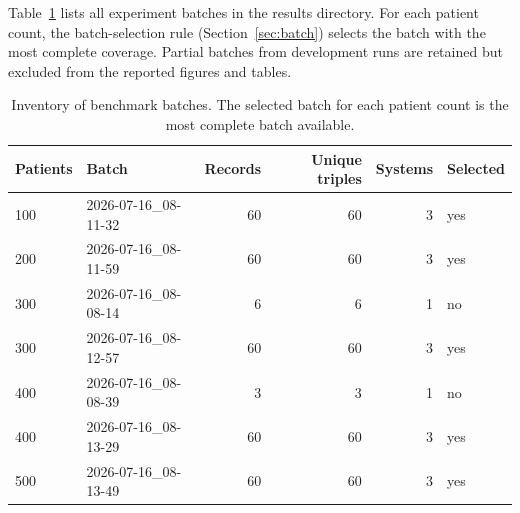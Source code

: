 Table~\ref{tab:benchmark_inventory} lists all experiment batches in the
results directory. For each patient count, the batch-selection rule
(Section~\ref{sec:batch}) selects the batch with the most complete coverage.
Partial batches from development runs are retained but excluded from the
reported figures and tables.

\begin{table}[htbp]
  \centering
  \caption{Inventory of benchmark batches. The selected batch for each patient
  count is the most complete batch available.}
  \label{tab:benchmark_inventory}
  \begin{tabular}{llrrrl}
    \toprule
    Patients & Batch & Records & Unique triples & Systems & Selected \\
    \midrule
    100 & 2026-07-16\_08-11-32 & 60 & 60 & 3 & yes \\
    200 & 2026-07-16\_08-11-59 & 60 & 60 & 3 & yes \\
    300 & 2026-07-16\_08-08-14 & 6 & 6 & 1 & no \\
    300 & 2026-07-16\_08-12-57 & 60 & 60 & 3 & yes \\
    400 & 2026-07-16\_08-08-39 & 3 & 3 & 1 & no \\
    400 & 2026-07-16\_08-13-29 & 60 & 60 & 3 & yes \\
    500 & 2026-07-16\_08-13-49 & 60 & 60 & 3 & yes \\
    \bottomrule
  \end{tabular}
\end{table}
